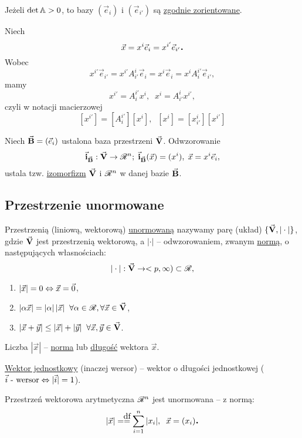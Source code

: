 Jeżeli $\det \mathbb{A} > 0$, to bazy $(\vec{e}_{i})$ i $(\vec{e}_{i'})$ są \underline{zgodnie zorientowane}.

Niech 
\[\vec{x} = x^i \vec{e}_i = x^{i'} \vec{e}_{i'} \mbox{\large\bfseries .}\]
Wobec
\[x^{i'} \vec{e}_{i'} = x^{i'} A_{i'}^i \vec{e}_i = x^i \vec{e}_i = x^i A^{i'}_i\vec{e}_{i'},\]
mamy
\[x^{i'} = A_i^{i'} x^i, \;\; x^{i} = A_{i'}^{i} x^{i'},\]
czyli w notacji macierzowej
\[[x^{i'}] = [A_i^{i'}][x^i], \;\; [x^i]=[x_{i'}^i][x^{i'}]\]

\begin{info}
   Niech $\vec{\mathbf{B}} = (\vec{e}_i)$ ustalona baza przestrzeni $\vec{\mathbf{V}}$.
   Odwzorowanie
   \[\vec{\mathbf{i}}_{\vec{\mathbf{B}}} : \vec{\mathbf{V}} \to \mathscr{R}^n; \; \vec{\mathbf{i}}_{\vec{\mathbf{B}}}(\vec{x}) = (x^i), \; \vec{x} = x^i \vec{e}_i,\]
   ustala tzw. \underline{izomorfizm} $\vec{\mathbf{V}}$ i $\mathscr{R}^n$ w danej bazie $\vec{\mathbf{B}}$.
\end{info}


\subsection{Przestrzenie unormowane}

\begin{mydef}
   Przestrzenią (liniową, wektorową) \underline{unormowaną} nazywamy parę (układ) $\{\vec{\mathbf{V}}, |\cdot|\}$, gdzie $\vec{\mathbf{V}}$ jest przestrzenią wektorową, a $|\cdot|$ -- odwzorowaniem, zwanym \underline{normą}, o następujących własnościach:
   \[|\cdot|: \vec{\mathbf{V}} \to <p, \infty) \subset \mathscr{R},\]
   \begin{enumerate}
    \item $|\vec{x}| = 0 \Leftrightarrow \vec{x} = \vec{0}$,
    \item $|\alpha \vec{x}| = |\alpha|\,|\vec{x}| \;\; \forall \alpha \in \mathscr{R}, \forall \vec{x} \in \vec{\mathbf{V}}$,
    \item $|\vec{x} + \vec{y}| \leq |\vec{x}| + |\vec{y}| \;\; \forall \vec{x}, \vec{y} \in \vec{\mathbf{V}}$.
   \end{enumerate}
   Liczba $|\vec{x}|$ -- \underline{norma} lub \underline{długość} wektora $\vec{x}$.
\end{mydef}

\begin{info}
   \underline{Wektor jednostkowy} (inaczej wersor) -- wektor o długości jednostkowej ($\vec{i} \text{ - wersor} \Leftrightarrow |\vec{i}| = 1$).
\end{info}

\begin{example}
   Przestrzeń wektorowa arytmetyczna $\mathscr{R}^n$ jest unormowana -- z normą:
   \[|\vec{x}| = \df \sum\limits_{i=1}^{n} |x_i|, \;\; \vec{x} = (x_i)\dend\]
\end{example}

